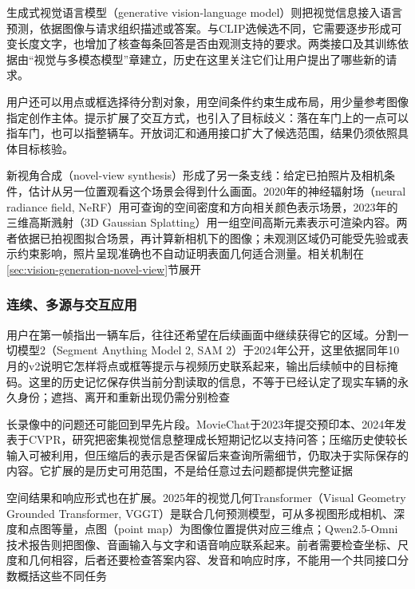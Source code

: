 生成式视觉语言模型（generative vision-language model）则把视觉信息接入语言预测，依据图像与请求组织描述或答案。与CLIP选候选不同，它需要逐步形成可变长度文字，也增加了核查每条回答是否由观测支持的要求。两类接口及其训练依据由“视觉与多模态模型”章建立，历史在这里关注它们让用户提出了哪些新的请求。

用户还可以用点或框选择待分割对象，用空间条件约束生成布局，用少量参考图像指定创作主体。提示扩展了交互方式，也引入了目标歧义：落在车门上的一点可以指车门，也可以指整辆车。开放词汇和通用接口扩大了候选范围，结果仍须依照具体目标核验。

新视角合成（novel-view synthesis）形成了另一条支线：给定已拍照片及相机条件，估计从另一位置观看这个场景会得到什么画面。2020年的神经辐射场（neural radiance field, NeRF）用可查询的空间密度和方向相关颜色表示场景，2023年的三维高斯溅射（3D Gaussian Splatting）用一组空间高斯元素表示可渲染内容。两者依据已拍视图拟合场景，再计算新相机下的图像；未观测区域仍可能受先验或表示约束影响，照片呈现准确也不自动证明表面几何适合测量。相关机制在\ref{sec:vision-generation-novel-view}节展开

\subsubsection{连续、多源与交互应用}
\label{sec:vision-overview-continuous-history}

用户在第一帧指出一辆车后，往往还希望在后续画面中继续获得它的区域。分割一切模型2（Segment Anything Model 2, SAM 2）于2024年公开，这里依据同年10月的v2说明它怎样将点或框等提示与视频历史联系起来，输出后续帧中的目标掩码。这里的历史记忆保存供当前分割读取的信息，不等于已经认定了现实车辆的永久身份；遮挡、离开和重新出现仍需分别检查

长录像中的问题还可能回到早先片段。MovieChat于2023年提交预印本、2024年发表于CVPR，研究把密集视觉信息整理成长短期记忆以支持问答；压缩历史使较长输入可被利用，但压缩后的表示是否保留后来查询所需细节，仍取决于实际保存的内容。它扩展的是历史可用范围，不是给任意过去问题都提供完整证据

空间结果和响应形式也在扩展。2025年的视觉几何Transformer（Visual Geometry Grounded Transformer, VGGT）是联合几何预测模型，可从多视图形成相机、深度和点图等量，点图（point map）为图像位置提供对应三维点；Qwen2.5-Omni技术报告则把图像、音画输入与文字和语音响应联系起来。前者需要检查坐标、尺度和几何相容，后者还要检查答案内容、发音和响应时序，不能用一个共同接口分数概括这些不同任务

